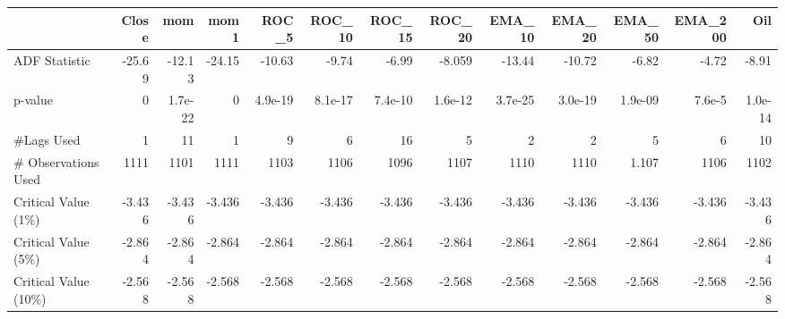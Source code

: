 {\tiny
\hspace*{-2cm}\begin{tabular}{lrrrrrrrrrrrr}
\toprule
{} &        Close &           mom &         mom1 &         ROC\_5 &        ROC\_10 &        ROC\_15 &        ROC\_20 &       EMA\_10 &       EMA\_20 &       EMA\_50 &      EMA\_200 &           Oil \\
\midrule
ADF Statistic               &   -25.69 & -12.13 &   -24.15 & -10.63 & -9.74 & -6.99 & -8.059 & -13.44 & -10.72 & -6.82 &    -4.72 & -8.91 \\

p-value                     &     0 &  1.7e-22 &     0 &  4.9e-19 &  8.1e-17 &  7.4e-10 &  1.6e-12 &  3.7e-25 &  3.0e-19 &  1.9e-09 &     7.6e-5 &  1.0e-14 \\
\#Lags Used                  &     1 &  11 &     1 &  9 &  6 &  16 &  5 &  2 &  2 &  5 &     6 &  10 \\
\# Observations Used &  1111 &  1101 &  1111 &  1103 &  1106 &  1096 &  1107 &  1110 &  1110 &  1.107 &  1106 &  1102 \\
Critical Value (1\%)         &    -3.436 & -3.436 & -3.436 &    -3.436 & -3.436 &    -3.436 & -3.436 & -3.436 & -3.436 & -3.436 & -3.436 & -3.436 \\
Critical Value (5\%)         &    -2.864 & -2.864 & -2.864 &    -2.864 & -2.864 &    -2.864 & -2.864 & -2.864 & -2.864 & -2.864 & -2.864 & -2.864 \\
Critical Value (10\%)        &    -2.568 & -2.568 & -2.568 &    -2.568 & -2.568 &    -2.568 & -2.568 & -2.568 & -2.568 & -2.568 & -2.568 & -2.568\\
\bottomrule
\end{tabular}\hspace*{-2cm}
}